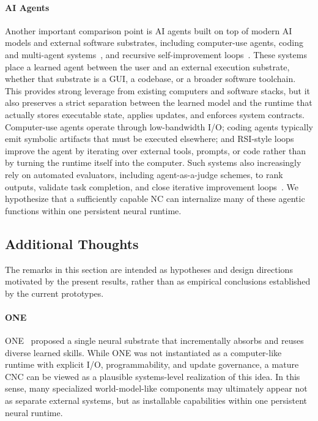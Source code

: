 \paragraph{AI Agents}
Another important comparison point is AI agents built on top of modern AI models and external software substrates, including computer-use agents, coding and multi-agent systems~\citep{openaiComputerUsingAgent,claudeComputerTool,hong2023metagpt,zhuge2024gptswarm_icml,sager2025comprehensivesurveyagentscomputer}, and recursive self-improvement loops~\citep{zhuge2026ai_recursive}. 
These systems place a learned agent between the user and an external execution substrate, whether that substrate is a GUI, a codebase, or a broader software toolchain.
This provides strong leverage from existing computers and software stacks, but it also preserves a strict separation between the learned model and the runtime that actually stores executable state, applies updates, and enforces system contracts.
Computer-use agents operate through low-bandwidth I/O; coding agents typically emit symbolic artifacts that must be executed elsewhere; and RSI-style loops improve the agent by iterating over external tools, prompts, or code rather than by turning the runtime itself into the computer.
Such systems also increasingly rely on automated evaluators, including agent-as-a-judge schemes, to rank outputs, validate task completion, and close iterative improvement loops~\citep{zhuge2024agent_judge}.
We hypothesize that a sufficiently capable NC can internalize many of these agentic functions within one persistent neural runtime.

\subsection{Additional Thoughts} %
The remarks in this section are intended as hypotheses and design directions motivated by the present results, rather than as empirical conclusions established by the current prototypes.

\paragraph{ONE}
ONE~\citep{schmidhuber2018one} proposed a single neural substrate that incrementally absorbs and reuses diverse learned skills. While ONE was not instantiated as a computer-like runtime with explicit I/O, programmability, and update governance, a mature CNC can be viewed as a plausible systems-level realization of this idea. In this sense, many specialized world-model-like components may ultimately appear not as separate external systems, but as installable capabilities within one persistent neural runtime.

